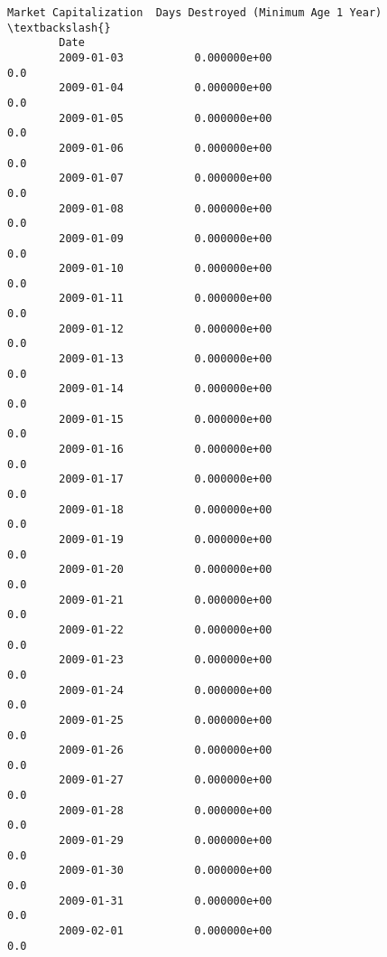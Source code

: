 \documentclass[11pt]{article}
\begin{document}
\begin{Verbatim}[commandchars=\\\{\}]
                    Market Capitalization  Days Destroyed (Minimum Age 1 Year)  \textbackslash{}
        Date                                                                     
        2009-01-03           0.000000e+00                                  0.0   
        2009-01-04           0.000000e+00                                  0.0   
        2009-01-05           0.000000e+00                                  0.0   
        2009-01-06           0.000000e+00                                  0.0   
        2009-01-07           0.000000e+00                                  0.0   
        2009-01-08           0.000000e+00                                  0.0   
        2009-01-09           0.000000e+00                                  0.0   
        2009-01-10           0.000000e+00                                  0.0   
        2009-01-11           0.000000e+00                                  0.0   
        2009-01-12           0.000000e+00                                  0.0   
        2009-01-13           0.000000e+00                                  0.0   
        2009-01-14           0.000000e+00                                  0.0   
        2009-01-15           0.000000e+00                                  0.0   
        2009-01-16           0.000000e+00                                  0.0   
        2009-01-17           0.000000e+00                                  0.0   
        2009-01-18           0.000000e+00                                  0.0   
        2009-01-19           0.000000e+00                                  0.0   
        2009-01-20           0.000000e+00                                  0.0   
        2009-01-21           0.000000e+00                                  0.0   
        2009-01-22           0.000000e+00                                  0.0   
        2009-01-23           0.000000e+00                                  0.0   
        2009-01-24           0.000000e+00                                  0.0   
        2009-01-25           0.000000e+00                                  0.0   
        2009-01-26           0.000000e+00                                  0.0   
        2009-01-27           0.000000e+00                                  0.0   
        2009-01-28           0.000000e+00                                  0.0   
        2009-01-29           0.000000e+00                                  0.0   
        2009-01-30           0.000000e+00                                  0.0   
        2009-01-31           0.000000e+00                                  0.0   
        2009-02-01           0.000000e+00                                  0.0   

\end{Verbatim}
\end{document}
